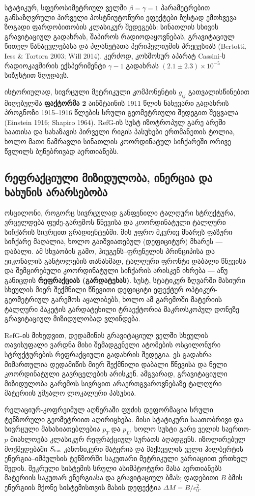\documentclass[11pt,a4paper]{article}
\begin{document}
სტატიკურ, სფეროსიმეტრიულ ველში $\beta=\gamma=1$ პარამეტრებით განსაზღვრული პირველი პოსტნიუტონური ეფექტები ზუსტად ემთხვევა ზოგადი ფარდობითობის კლასიკურ შედეგებს: სინათლის სხივის გრავიტაციულ გადახრას, შაპიროს რადიოდაყოვნებას, გრავიტაციულ წითელ წანაცვლებასა და პლანეტათა პერიჰელიუმის პრეცესიას (Bertotti, Iess \& Tortora 2003; Will 2014). კერძოდ, კოსმოსურ აპარატ Cassini-ს რადიოკავშირის ექსპერიმენტი $\gamma - 1$ გადახრას $(2.1 \pm 2.3) \times 10^{-5}$ სიზუსტით ზღუდავს.

ისტორიულად, სივრცული მეტრიკული კომპონენტის $g_{ij}$ გათვალისწინებით მიღებულმა \textbf{ფაქტორმა 2} აინშტაინის 1911 წლის ნახევარი გადახრის პროგნოზი 1915–1916 წლების სრული გეომეტრიული შედეგით შეცვალა (Einstein 1916; Shapiro 1964). RefG-ის სუსტ იზოტროპულ გარე არეში საათისა და სახაზავის პირველი რიგის პასუხები ერთმანეთის ტოლია, ხოლო მათი ნამრავლი სინათლის კოორდინატულ სიჩქარეში ორივე წვლილს ბუნებრივად აერთიანებს.


\subsection{რეფრაქციული მიზიდულობა, ინერცია და ხახუნის არარსებობა}

ოსცილონი, როგორც სივრცულად განფენილი ტალღური სტრუქტურა, ვრცელდება ფუძე-გარემოს წნევისა და კოორდინატული ტალღური სიჩქარის სივრცით გრადიენტებში. მის უფრო მკვრივ მხარეს ფაზური სიჩქარე მაღალია, ხოლო გაიშვიათებულ (დეფიციტურ) მხარეს — დაბალი. ამ სხვაობის გამო, ჰიუგენს–ფრენელის პრინციპისა და ეიკონალის განტოლების თანახმად, ტალღური ფრონტი დაბალი წნევისა და შემცირებული კოორდინატული სიჩქარის არისკენ იხრება — ანუ განიცდის \textbf{რეფრაქციას (გარდატეხას)}. სუსტ, სტატიკურ ზღვარში მასიური სხეულის მიერ შექმნილი წნევითი დეფიციტი ეფექტურ ოპტიკურ-გეომეტრიულ გარემოს აყალიბებს, ხოლო ამ გარემოში მატერიის ტალღური პაკეტის გარდატეხილი ტრაექტორია მაკროსკოპულ დონეზე გრავიტაციულ მიზიდულობად ვლინდება.

RefG-ის მიხედვით, დედამიწის გრავიტაციულ ველში სხეულის თავისუფალი ვარდნა მისი შემადგენელი ატომების ოსცილონური სტრუქტურების რეფრაქციული გადახრის შედეგია. ეს გადახრა მიმართულია დედამიწის მიერ შექმნილი დაბალი წნევისა და ნელი კოორდინატული გავრცელების არისკენ. ამგვარად, გრავიტაციული მიზიდულობა გარემოს სივრცით არაერთგვაროვნებაზე ტალღური მატერიის უშუალო ლოკალური პასუხია.

რელაციურ-კოფრეიმულ აღწერაში ფუძის დეფორმაცია სრული ტენზორული გეომეტრიით აღირიცხება. მისი სტატიკური საათობრივი და სივრცული მახასიათებლებია $p_T$ და $p_L$, ხოლო სუსტი გარე ველის საერთო-$p$ მიახლოება კლასიკურ რეფრაქციულ სურათს აღადგენს. იზოლირებულ მოქმედებაში $S_{\rm iso}$ კანონიკური მატერია და მაქსველის ველი ჰილბერტის ენერგია–იმპულსის ტენზორში საკუთარი მეტრიკული ვარიაციით ერთხელ შედის. შეკრული სისტემის სრული ასიმპტოტური მასა აერთიანებს მატერიის საკუთარ ენერგიასა და გრავიტაციულ ბმას; დადებითი $B$ ბმის ენერგიის მქონე სისტემისთვის მასის დეფექტია $\Delta M=B/c_0^2$.
\end{document}
